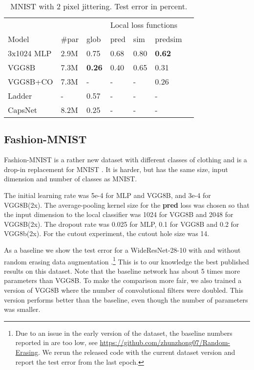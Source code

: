 \documentclass{article}
\begin{document}
\begin{table}[h]
  \caption{MNIST with 2 pixel jittering. Test error in percent.}
  \label{table:mnist}
  \centering
  \begin{tabular}{lllllll}
    \toprule
    &&& \multicolumn{3}{|l}{Local loss functions} \\
    Model   & \#par & glob & \multicolumn{1}{|l}{pred} & sim & \multicolumn{1}{l}{predsim}  \\
    \midrule
    3x1024 MLP & 2.9M &  0.75 & \multicolumn{1}{|l}{0.68} & 0.80  & \textbf{0.62} \\
    VGG8B      & 7.3M &  \textbf{0.26} & \multicolumn{1}{|l}{0.40} & 0.65  & 0.31 \\
    VGG8B+CO      & 7.3M &  - & \multicolumn{1}{|l}{-} & - & 0.26 \\
    \midrule
    Ladder     & - & 0.57  & \multicolumn{1}{|l}{-} & - & - \\
    CapsNet    & 8.2M & 0.25  & \multicolumn{1}{|l}{-} & - & - \\
    \bottomrule
  \end{tabular}
\end{table}

\subsection{Fashion-MNIST}

Fashion-MNIST is a rather new dataset with different classes of clothing and is a drop-in replacement for MNIST \cite{Fashion17}. It is harder, but has the same size, input dimension and number of classes as MNIST. 

The initial learning rate was 5e-4 for MLP and VGG8B, and 3e-4 for VGG8B(2x). The average-pooling kernel size for the \textbf{pred} loss was chosen so that the input dimension to the local classifier was 1024 for VGG8B and 2048 for VGG8B(2x). The dropout rate was 0.025 for MLP, 0.1 for VGG8B and 0.2 for VGG8b(2x). For the cutout experiment, the cutout hole size was 14.

As a baseline we show the test error for a WideResNet-28-10 \cite{ZagoruykoK16} with and without random erasing data augmentation \cite{ZhongZKLY17}.\footnote{Due to an issue in the early version of the dataset, the baseline numbers reported in \cite{ZhongZKLY17} are too low, see \url{https://github.com/zhunzhong07/Random-Erasing}. We rerun the released code with the current dataset version and report the test error from the last epoch. } This is to our knowledge the best published results on this dataset. Note that the baseline network has about 5 times more parameters than VGG8B. To make the comparison more fair, we also trained a version of VGG8B where the number of convolutional filters were doubled. This version performs better than the baseline, even though the number of parameters was smaller.
\end{document}
